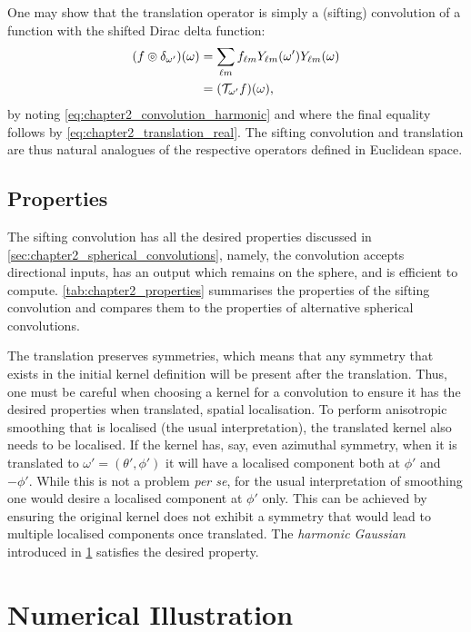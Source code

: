 One may show that the translation operator is simply a (sifting) convolution of a function with the shifted Dirac delta function:
%
\begin{align}
	\pixel{\convolution{f}{\delta_{\omega'}}}
	 & = \harmonicSum \harmonic{f} \pixel[']{\harmonic{Y}} \pixel{\harmonic{Y}} \nonumber{} \\
	 & = \pixel{(\translation{\omega'}f)},
\end{align}
%
by noting \cref{eq:chapter2_convolution_harmonic} and where the final equality follows by \cref{eq:chapter2_translation_real}.
The sifting convolution and translation are thus natural analogues of the respective operators defined in Euclidean space.

\subsection{Properties}\label{sec:chapter2_properties}

The sifting convolution has all the desired properties discussed in \cref{sec:chapter2_spherical_convolutions}, namely, the convolution accepts directional inputs, has an output which remains on the sphere, and is efficient to compute.
\cref{tab:chapter2_properties} summarises the properties of the sifting convolution and compares them to the properties of alternative spherical convolutions.

The translation preserves symmetries, which means that any symmetry that exists in the initial kernel definition will be present after the translation.
Thus, one must be careful when choosing a kernel for a convolution to ensure it has the desired properties when translated, \eg{} spatial localisation.
To perform anisotropic smoothing that is localised (the usual interpretation), the translated kernel also needs to be localised.
If the kernel has, say, even azimuthal symmetry, when it is translated to \(\omega'=(\theta', \phi')\) it will have a localised component both at \(\phi'\) and \(-\phi'\).
While this is not a problem \emph{per se}, for the usual interpretation of smoothing one would desire a localised component at \(\phi'\) only.
This can be achieved by ensuring the original kernel does not exhibit a symmetry that would lead to multiple localised components once translated.
The \emph{harmonic Gaussian} introduced in \cref{sec:chapter2_numerical_illustration} satisfies the desired property.

\section{Numerical Illustration}\label{sec:chapter2_numerical_illustration}

